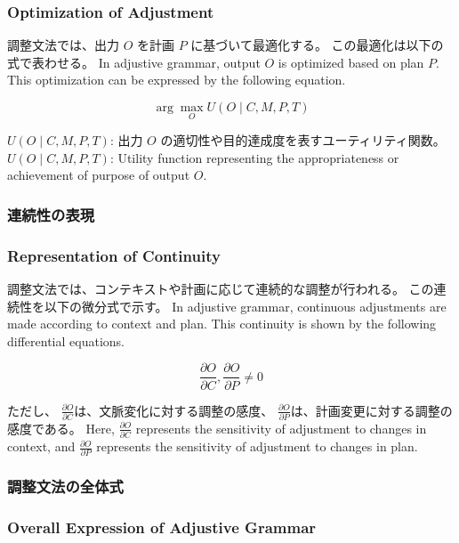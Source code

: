 \documentclass[a4paper,xelatex,ja=standard]{bxjsarticle}
\begin{document}
\subsubsection{Optimization of Adjustment}
\fi

\ifJPN
調整文法では、出力 \( O \) を計画 \( P \) に基づいて最適化する。
この最適化は以下の式で表わせる。
\else
In adjustive grammar, output \( O \) is optimized based on plan \( P \).
This optimization can be expressed by the following equation.
\fi

\[
\arg\max_{O} U(O \mid C, M, P, T)
\]

\ifJPN
\( U(O \mid C, M, P, T) \): 出力 \( O \) の適切性や目的達成度を表すユーティリティ関数。
\else
\( U(O \mid C, M, P, T) \): Utility function representing the appropriateness or achievement of purpose of output \( O \).
\fi

\ifJPN
\subsubsection{連続性の表現}
\else
\subsubsection{Representation of Continuity}
\fi

\ifJPN
調整文法では、コンテキストや計画に応じて連続的な調整が行われる。
この連続性を以下の微分式で示す。
\else
In adjustive grammar, continuous adjustments are made according to context and plan.
This continuity is shown by the following differential equations.
\fi

\[
\frac{\partial O}{\partial C}, \frac{\partial O}{\partial P} \neq 0
\]

\ifJPN
ただし、
\( \frac{\partial O}{\partial C} \)は、文脈変化に対する調整の感度、
\( \frac{\partial O}{\partial P} \)は、計画変更に対する調整の感度である。
\else
Here, \( \frac{\partial O}{\partial C} \) represents the sensitivity of adjustment to changes in context, and \( \frac{\partial O}{\partial P} \) represents the sensitivity of adjustment to changes in plan.
\fi

\ifJPN
\subsubsection{調整文法の全体式}
\else
\subsubsection{Overall Expression of Adjustive Grammar}
\fi
\end{document}
